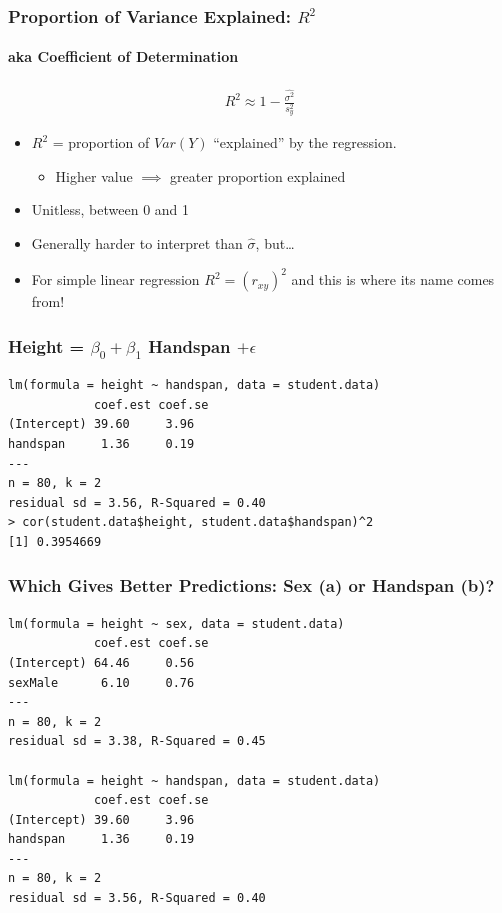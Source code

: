 \documentclass[handout]{beamer}
\begin{document}
\begin{frame}
\frametitle{Proportion of Variance Explained: $R^2$}
\framesubtitle{aka Coefficient of Determination}
	\begin{eqnarray*}
		R^2 \approx 1 - \frac{\widehat{\sigma^2}}{s_y^2}
	\end{eqnarray*}
		\begin{itemize}
			\item $R^2$ = proportion of $Var(Y)$ 
        ``explained'' by the regression.
			\begin{itemize}
			\item Higher value $\implies$ greater proportion explained 
			\end{itemize}
			\item Unitless, between 0 and 1 
      \item Generally harder to interpret than $\widehat{\sigma}$, but\dots 
			\item \alert{For simple linear regression $R^2 = (r_{xy})^2$ and this is where its name comes from!}
		\end{itemize}
\end{frame}



\begin{frame}[fragile]
\frametitle{Height = $\beta_0 + \beta_1$ Handspan $+ \epsilon$}
\footnotesize
\begin{verbatim}
lm(formula = height ~ handspan, data = student.data)
            coef.est coef.se
(Intercept) 39.60     3.96  
handspan     1.36     0.19  
---
n = 80, k = 2
residual sd = 3.56, R-Squared = 0.40
> cor(student.data$height, student.data$handspan)^2
[1] 0.3954669
\end{verbatim}
\end{frame}


\begin{frame}[fragile]
\frametitle{Which Gives Better Predictions: Sex (a) or Handspan (b)?}
\footnotesize
\begin{verbatim}
lm(formula = height ~ sex, data = student.data)
            coef.est coef.se
(Intercept) 64.46     0.56  
sexMale      6.10     0.76  
---
n = 80, k = 2
residual sd = 3.38, R-Squared = 0.45

lm(formula = height ~ handspan, data = student.data)
            coef.est coef.se
(Intercept) 39.60     3.96  
handspan     1.36     0.19  
---
n = 80, k = 2
residual sd = 3.56, R-Squared = 0.40
\end{verbatim}

\end{frame}



\end{document}
